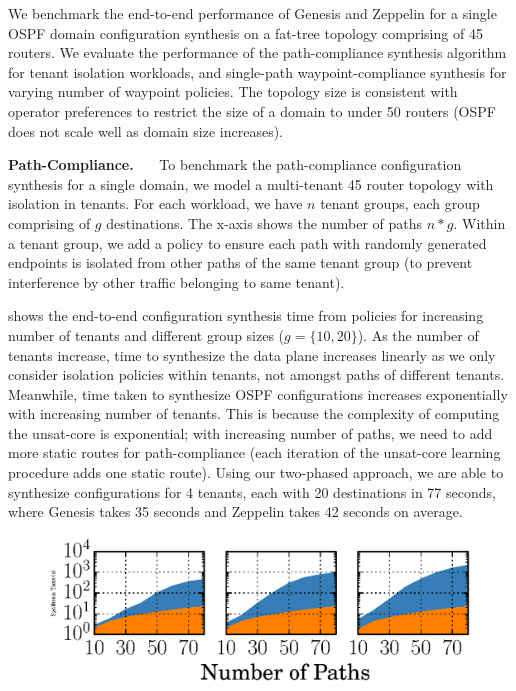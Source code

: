 We benchmark the end-to-end performance of Genesis and Zeppelin
for a single OSPF domain configuration  synthesis on a fat-tree 
topology comprising of 45 routers. We evaluate the performance
of the path-compliance synthesis algorithm for tenant 
isolation workloads, and single-path waypoint-compliance 
synthesis for varying number of waypoint policies.
The topology size is consistent with operator preferences to restrict
the size of a domain to under 50 routers (OSPF does not scale
well as domain size increases).

\noindent\textbf{Path-Compliance.}~~~
To benchmark the path-compliance 
configuration synthesis for a single domain, we 
model a multi-tenant 45 router topology with 
isolation in tenants. For each 
workload, we have $n$ tenant groups, 
each group comprising of $g$ destinations. 
The x-axis shows the number of paths $n * g$. 
Within a tenant group, we add a policy to ensure
each path with randomly generated endpoints 
is isolated from other paths of the same tenant group 
(to prevent interference by other traffic belonging to
same tenant).  

shows the end-to-end configuration synthesis time from policies 
for increasing number of tenants and different group sizes ($g =
\{10,20\}$). As the number of tenants increase, time to 
synthesize the data plane increases linearly as we only 
consider isolation policies within tenants, not amongst paths 
of different tenants. Meanwhile, time taken to synthesize 
OSPF configurations increases exponentially with increasing 
number of tenants. This is because the complexity of computing 
the unsat-core is exponential; with increasing number of 
paths, we need to add more static routes for 
path-compliance (each iteration of the unsat-core learning
procedure adds one static route). Using our two-phased approach,
we are able to synthesize configurations for 4 tenants, each with
20 destinations in 77 seconds, where Genesis takes 35 seconds and
Zeppelin takes 42 seconds on average. 


\begin{figure}
	\begin{center}
		\includegraphics[width=0.6\columnwidth]{figures/ospfwaypoint.eps}
	\end{center} 
\end{figure}

